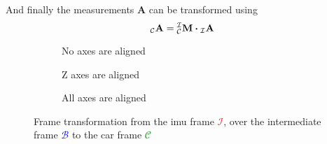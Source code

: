 And finally the measurements $\mathbf{A}$ can be transformed using
\begin{equation}
    \vincs{A}{c} = \mtf{i}{c} \vdot \vincs{A}{i}
\end{equation}
\begin{figure}[htb]
    \centering
    \begin{subfigure}[b]{0.3\textwidth}
        \centering
        
        \caption{No axes are aligned}
        \label{fig:tikz_frame_transformation_init}
    \end{subfigure}
    \hfill
    \begin{subfigure}[b]{0.3\textwidth}
        \centering
        
        \caption{Z axes are aligned}
        \label{fig:tikz_frame_transformation_intermediate}
    \end{subfigure}
    \hfill
    \begin{subfigure}[b]{0.3\textwidth}
        \centering
        
        \caption{All axes are aligned}
        \label{fig:tikz_frame_transformation_final}
    \end{subfigure}
    \caption[Frame transformation]{Frame transformation from the \gls{imu} frame \textcolor{red}{$\mathcal{I}$}, over the intermediate frame \textcolor{blue}{$\mathcal{B}$} to the car frame \textcolor{green}{$\mathcal{C}$}}
    \label{fig:tikz_frame_transformation}
\end{figure}


